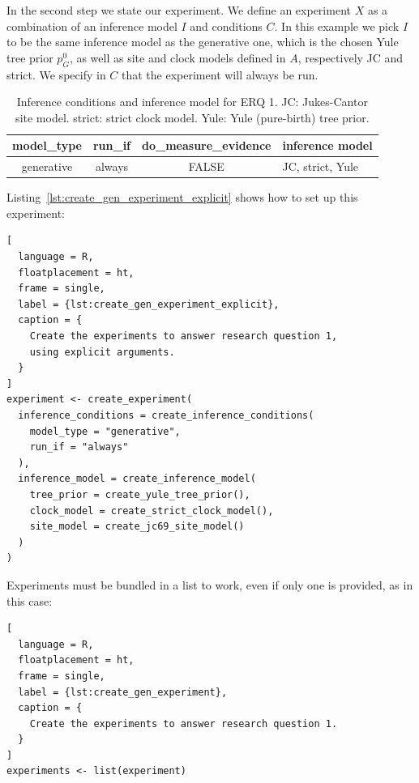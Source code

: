 \documentclass{article}
\begin{document}
In the second step we state our experiment.
We define an experiment $\mathit{X}$ as a combination of an inference model 
$\mathit{I}$
and conditions $\mathit{C}$.
In this example we pick $\mathit{I}$ to be the same inference model as the 
generative one,
which is the chosen Yule tree prior $\mathit{p_{G}^0}$, as well as site and clock 
models defined in $\mathit{A}$, respectively JC and strict.
We specify in $\mathit{C}$ that the experiment will always be run.

\begin{table}
  \begin{tabular}{ | c | c | c | l | }
    \hline
    \textbf{model\_type} &
    \textbf{run\_if} &
    \textbf{do\_measure\_evidence} & 
    \textbf{inference model} \\ 
    \hline
    generative &
    always &
    FALSE &
    JC, strict, Yule \\
    \hline
  \end{tabular}
  \caption{
    Inference conditions and inference model for ERQ 1.
    JC: Jukes-Cantor site model.
    strict: strict clock model.
    Yule: Yule (pure-birth) tree prior.
  }
  \label{tab:RQ1}
\end{table}

Listing~\ref{lst:create_gen_experiment_explicit} shows how to
set up this experiment:

\begin{lstlisting}[
  language = R,
  floatplacement = ht,
  frame = single,
  label = {lst:create_gen_experiment_explicit},
  caption = {
    Create the experiments to answer research question 1, 
    using explicit arguments.
  }
]
experiment <- create_experiment(
  inference_conditions = create_inference_conditions(
    model_type = "generative", 
    run_if = "always"
  ), 
  inference_model = create_inference_model(
    tree_prior = create_yule_tree_prior(),
    clock_model = create_strict_clock_model(), 
    site_model = create_jc69_site_model()
  )
)
\end{lstlisting}

Experiments must be bundled in a list to work, even if only one is provided, as 
in this case:

\begin{lstlisting}[
  language = R, 
  floatplacement = ht,
  frame = single,
  label = {lst:create_gen_experiment},
  caption = {
    Create the experiments to answer research question 1.
  }
]
experiments <- list(experiment)
\end{lstlisting}
\end{document}

